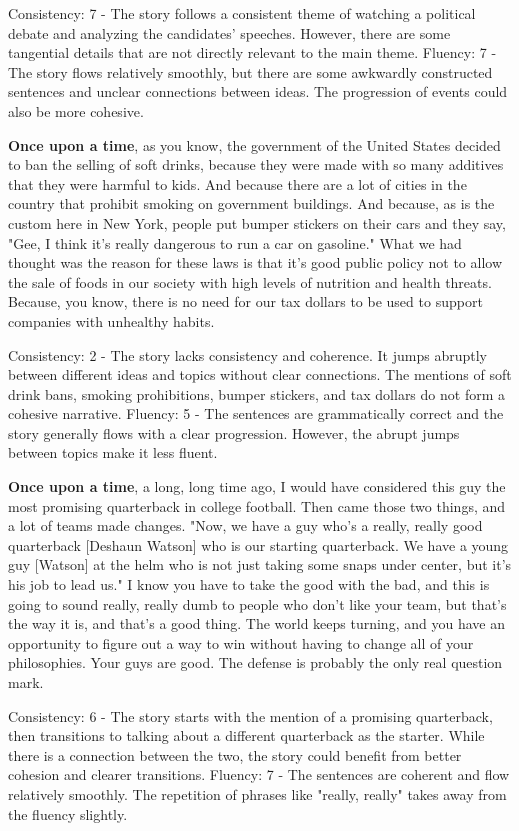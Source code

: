 \documentclass{article}
\begin{document}
Consistency: 7 - The story follows a consistent theme of watching a political debate and analyzing the candidates' speeches. However, there are some tangential details that are not directly relevant to the main theme.
Fluency: 7 - The story flows relatively smoothly, but there are some awkwardly constructed sentences and unclear connections between ideas. The progression of events could also be more cohesive.

\textbf{Once upon a time}, as you know, the government of the United States decided to ban the selling of soft drinks, because they were made with so many additives that they were harmful to kids. And because there are a lot of cities in the country that prohibit smoking on government buildings. And because, as is the custom here in New York, people put bumper stickers on their cars and they say, "Gee, I think it's really dangerous to run a car on gasoline." What we had thought was the reason for these laws is that it's good public policy not to allow the sale of foods in our society with high levels of nutrition and health threats. Because, you know, there is no need for our tax dollars to be used to support companies with unhealthy habits.

Consistency: 2 - The story lacks consistency and coherence. It jumps abruptly between different ideas and topics without clear connections. The mentions of soft drink bans, smoking prohibitions, bumper stickers, and tax dollars do not form a cohesive narrative. 
Fluency: 5 - The sentences are grammatically correct and the story generally flows with a clear progression. However, the abrupt jumps between topics make it less fluent. 

\textbf{Once upon a time}, a long, long time ago, I would have considered this guy the most promising quarterback in college football. Then came those two things, and a lot of teams made changes. "Now, we have a guy who's a really, really good quarterback [Deshaun Watson] who is our starting quarterback. We have a young guy [Watson] at the helm who is not just taking some snaps under center, but it's his job to lead us." I know you have to take the good with the bad, and this is going to sound really, really dumb to people who don't like your team, but that's the way it is, and that's a good thing. The world keeps turning, and you have an opportunity to figure out a way to win without having to change all of your philosophies. Your guys are good. The defense is probably the only real question mark.

Consistency: 6 - The story starts with the mention of a promising quarterback, then transitions to talking about a different quarterback as the starter. While there is a connection between the two, the story could benefit from better cohesion and clearer transitions. 
Fluency: 7 - The sentences are coherent and flow relatively smoothly. The repetition of phrases like "really, really" takes away from the fluency slightly. 
\end{document}
